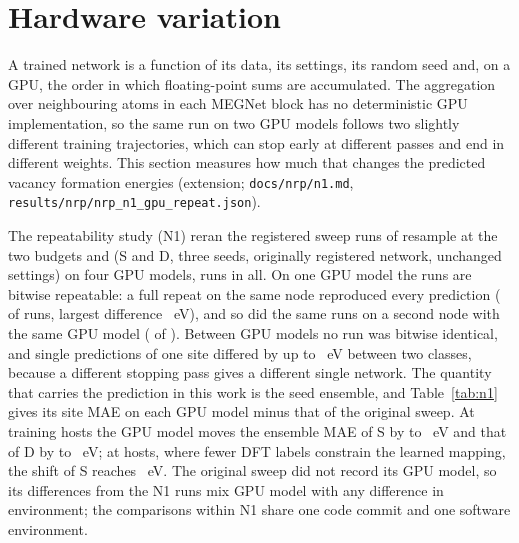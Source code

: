\section{Hardware variation}
\label{si:hardware}

A trained network is a function of its data, its settings, its random seed and, on a GPU, the order in which
floating-point sums are accumulated. The aggregation over neighbouring atoms in each MEGNet block has no
deterministic GPU implementation, so the same run on two GPU models follows two slightly different training
trajectories, which can stop early at different passes and end in different weights. This section measures how
much that changes the predicted vacancy formation energies (extension; \texttt{docs/nrp/n1.md},
\texttt{results/nrp/nrp\_n1\_gpu\_repeat.json}).

The repeatability study (N1) reran the \numNrpNOneGpuRepeatCrossNodeSameClassSummaryN{} registered sweep runs of
resample \numCfgTuningAnchorResample{} at the two budgets \numCfgBudgetsHostsItemSix{} and
\numCfgBudgetsHostsItemFour{} (S and D, three seeds, originally registered network, unchanged settings) on four
GPU models, \numNrpNOneGpuRepeatNRuns{} runs in all. On one GPU model the runs are bitwise repeatable: a full
repeat on the same node reproduced every prediction
(\numNrpNOneGpuRepeatSameNodeRepeatSummaryBitwiseIdentical{} of \numNrpNOneGpuRepeatSameNodeRepeatSummaryN{} runs,
largest difference \numNrpNOneGpuRepeatSameNodeRepeatSummaryMaxAbsDiffEV{}~eV), and so did the same runs on a
second node with the same GPU model (\numNrpNOneGpuRepeatCrossNodeSameClassSummaryBitwiseIdentical{} of
\numNrpNOneGpuRepeatCrossNodeSameClassSummaryN{}). Between GPU models no run was bitwise identical, and single
predictions of one site differed by up to
\numNOneRecomputeCrossClassATenGpuFiveNrpMghpccOrgPassOneRtxAFourThousandRyGpuSixteenSdscOptiputerNetPassOneMaxAbsDiffEV{}~eV
between two classes, because a different stopping pass gives a different single network. The quantity that carries
the prediction in this work is the seed ensemble, and Table~\ref{tab:n1} gives its site MAE on each GPU model
minus that of the original sweep. At \numCfgBudgetsHostsItemSix{} training hosts the GPU model moves the ensemble
MAE of S by \numNrpNOneGpuRepeatEnsembleGeforceRtxThreeThousandNinetySSixHundredFiftyFourRyGpuTwoSdscOptiputerNetPassOneEnsembleMaeMinusRef{}
to \numNrpNOneGpuRepeatEnsembleLFourSSixHundredFiftyFourNautilusItGpuFiveFullertonEduPassOneEnsembleMaeMinusRef{}~eV
and that of D by \numNrpNOneGpuRepeatEnsembleGeforceRtxThreeThousandNinetyDStateSixHundredFiftyFourRyGpuTwoSdscOptiputerNetPassOneEnsembleMaeMinusRef{}
to \numNrpNOneGpuRepeatEnsembleRtxAFourThousandDStateSixHundredFiftyFourRyGpuSixteenSdscOptiputerNetPassOneEnsembleMaeMinusRef{}~eV;
at \numCfgBudgetsHostsItemFour{} hosts, where fewer DFT labels constrain the learned mapping, the shift of S
reaches \numNrpNOneGpuRepeatEnsembleRtxAFourThousandSTwoHundredRyGpuSixteenSdscOptiputerNetPassOneEnsembleMaeMinusRef{}~eV. The original sweep did
not record its GPU model, so its differences from the N1 runs mix GPU model with any difference in environment; the
comparisons within N1 share one code commit and one software environment.

